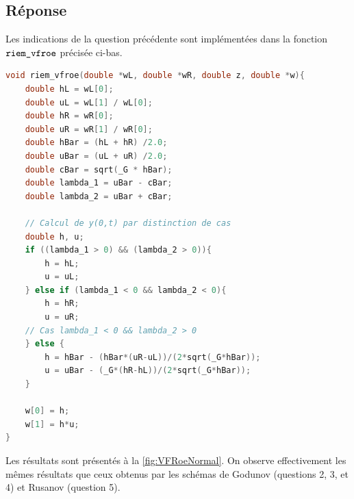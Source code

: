 \documentclass[
	french,
	11pt, %
]{fphw}
\begin{document}
\subsection*{Réponse} 

Les indications de la question précédente sont implémentées dans la fonction $\verb|riem_vfroe|$ précisée ci-bas.

\begin{lstlisting}[language=C, caption={Programmation du flux numérique VFRoe.},breaklines]
void riem_vfroe(double *wL, double *wR, double z, double *w){
    double hL = wL[0];
    double uL = wL[1] / wL[0];
    double hR = wR[0];
    double uR = wR[1] / wR[0];
    double hBar = (hL + hR) /2.0;
    double uBar = (uL + uR) /2.0;
    double cBar = sqrt(_G * hBar);
    double lambda_1 = uBar - cBar;
    double lambda_2 = uBar + cBar;

	// Calcul de y(0,t) par distinction de cas
    double h, u;
    if ((lambda_1 > 0) && (lambda_2 > 0)){
        h = hL;
        u = uL;
    } else if (lambda_1 < 0 && lambda_2 < 0){
        h = hR;
        u = uR;
    // Cas lambda_1 < 0 && lambda_2 > 0
    } else {
        h = hBar - (hBar*(uR-uL))/(2*sqrt(_G*hBar));
        u = uBar - (_G*(hR-hL))/(2*sqrt(_G*hBar));
    }

    w[0] = h;
    w[1] = h*u;
}	
\end{lstlisting}
Les résultats sont présentés à la \cref{fig:VFRoeNormal}. On observe effectivement les mêmes résultats que ceux obtenus par les schémas de Godunov (questions 2, 3, et 4) et Rusanov (question 5).
\end{document}
